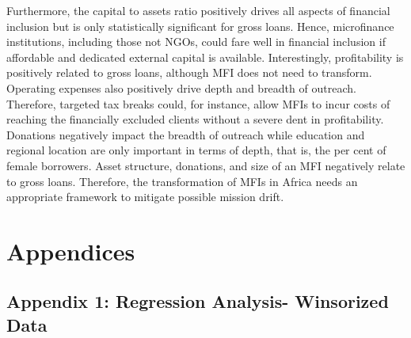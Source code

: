 \documentclass[a4paper, nobind]{templates/ociamthesis}
\begin{document}
Furthermore, the capital to assets ratio positively drives all aspects of financial inclusion but is only statistically significant for gross loans. Hence, microfinance institutions, including those not NGOs, could fare well in financial inclusion if affordable and dedicated external capital is available. Interestingly, profitability is positively related to gross loans, although MFI does not need to transform. Operating expenses also positively drive depth and breadth of outreach. Therefore, targeted tax breaks could, for instance, allow MFIs to incur costs of reaching the financially excluded clients without a severe dent in profitability. Donations negatively impact the breadth of outreach while education and regional location are only important in terms of depth, that is, the per cent of female borrowers. Asset structure, donations, and size of an MFI negatively relate to gross loans. Therefore, the transformation of MFIs in Africa needs an appropriate framework to mitigate possible mission drift.

\hypertarget{appendices-1}{%
\section{Appendices}\label{appendices-1}}

\hypertarget{appendix-1-regression-analysis--winsorized-data}{%
\subsection{Appendix 1: Regression Analysis- Winsorized Data}\label{appendix-1-regression-analysis--winsorized-data}}
\end{document}
